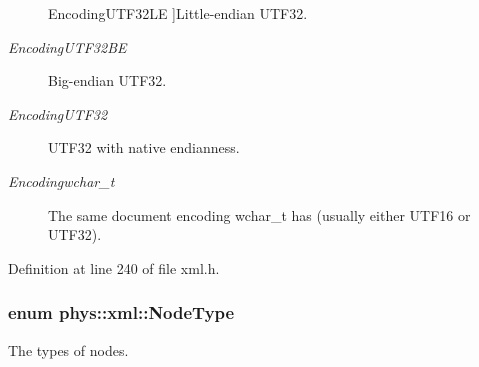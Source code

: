 \begin{Desc}
\begin{description}
{\hypertarget{namespacephys_1_1xml_a420f5de782438f88160321385bea2015a127752883aaf8c9bdb5f66ec725211fc}{
EncodingUTF32LE}
\label{d9/d27/namespacephys_1_1xml_a420f5de782438f88160321385bea2015a127752883aaf8c9bdb5f66ec725211fc}
}]Little-\/endian UTF32. \item[{\em 
\hypertarget{namespacephys_1_1xml_a420f5de782438f88160321385bea2015a5fb13deaf1552b0f4c00e2b8cafce0b9}{
EncodingUTF32BE}
\label{d9/d27/namespacephys_1_1xml_a420f5de782438f88160321385bea2015a5fb13deaf1552b0f4c00e2b8cafce0b9}
}]Big-\/endian UTF32. \item[{\em 
\hypertarget{namespacephys_1_1xml_a420f5de782438f88160321385bea2015ac61c2f632bd66c2466c29783beb33f8a}{
EncodingUTF32}
\label{d9/d27/namespacephys_1_1xml_a420f5de782438f88160321385bea2015ac61c2f632bd66c2466c29783beb33f8a}
}]UTF32 with native endianness. \item[{\em 
\hypertarget{namespacephys_1_1xml_a420f5de782438f88160321385bea2015a2bc9c8d42796901c8feaa25e17c56cef}{
Encodingwchar\_\-t}
\label{d9/d27/namespacephys_1_1xml_a420f5de782438f88160321385bea2015a2bc9c8d42796901c8feaa25e17c56cef}
}]The same document encoding wchar\_\-t has (usually either UTF16 or UTF32). \end{description}
\end{Desc}



Definition at line 240 of file xml.h.

\hypertarget{namespacephys_1_1xml_a668b0cc666a9d49f7c7222a7552115d3}{
\subsubsection[{NodeType}]{\setlength{\rightskip}{0pt plus 5cm}enum {\bf phys::xml::NodeType}}}
\label{d9/d27/namespacephys_1_1xml_a668b0cc666a9d49f7c7222a7552115d3}


The types of nodes. 

